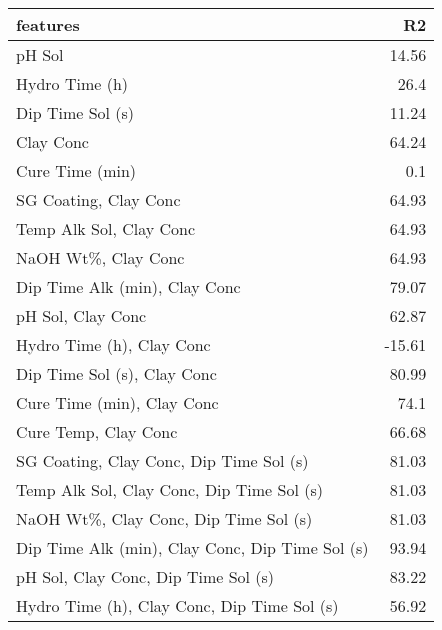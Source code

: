 
    \begin{table*}[h]
        \centering
        \begin{tabular}{lr}
\hline
 features                                                         &     R2 \\
\hline
 pH Sol                                                           &  14.56 \\
 Hydro Time (h)                                                   &  26.4  \\
 Dip Time Sol (s)                                                 &  11.24 \\
 Clay Conc                                                        &  64.24 \\
 Cure Time (min)                                                  &   0.1  \\
 SG Coating, Clay Conc                                            &  64.93 \\
 Temp Alk Sol, Clay Conc                                          &  64.93 \\
 NaOH Wt\%, Clay Conc                                             &  64.93 \\
 Dip Time Alk (min), Clay Conc                                    &  79.07 \\
 pH Sol, Clay Conc                                                &  62.87 \\
 Hydro Time (h), Clay Conc                                        & -15.61 \\
 Dip Time Sol (s), Clay Conc                                      &  80.99 \\
 Cure Time (min), Clay Conc                                       &  74.1  \\
 Cure Temp, Clay Conc                                             &  66.68 \\
 SG Coating, Clay Conc, Dip Time Sol (s)                          &  81.03 \\
 Temp Alk Sol, Clay Conc, Dip Time Sol (s)                        &  81.03 \\
 NaOH Wt\%, Clay Conc, Dip Time Sol (s)                           &  81.03 \\
 Dip Time Alk (min), Clay Conc, Dip Time Sol (s)                  &  93.94 \\
 pH Sol, Clay Conc, Dip Time Sol (s)                              &  83.22 \\
 Hydro Time (h), Clay Conc, Dip Time Sol (s)                      &  56.92 \\

\end{tabular}
\end{table*}
